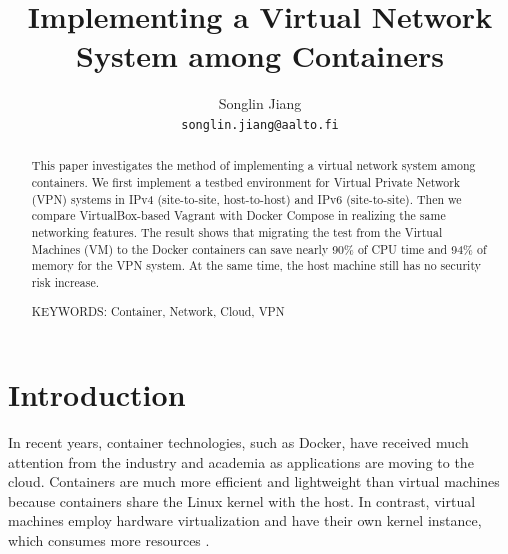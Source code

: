 \documentclass[article]{aaltoseries}
\begin{document}
 

\title{Implementing a Virtual Network System among Containers}

\author{Songlin Jiang%
\\\textnormal{\texttt{songlin.jiang@aalto.fi}}} %


\maketitle


\begin{abstract}
This paper investigates the method of implementing a virtual network system among containers. We first implement a testbed environment for Virtual Private Network (VPN) systems in IPv4 (site-to-site, host-to-host) and IPv6 (site-to-site). Then we compare VirtualBox-based Vagrant with Docker Compose in realizing the same networking features. The result shows that migrating the test from the Virtual Machines (VM) to the Docker containers can save nearly 90\% of CPU time and 94\% of memory for the VPN system. At the same time, the host machine still has no security risk increase.

\vspace{3mm}
\noindent KEYWORDS: Container, Network, Cloud, VPN

\end{abstract}




\section{Introduction}

In recent years, container technologies, such as Docker, have received much attention from the industry and academia as applications are moving to the cloud. Containers are much more efficient and lightweight than virtual machines because containers share the Linux kernel with the host. In contrast, virtual machines employ hardware virtualization and have their own kernel instance, which consumes more resources \cite{10.1145/2988336.2988337}.
\end{document}
